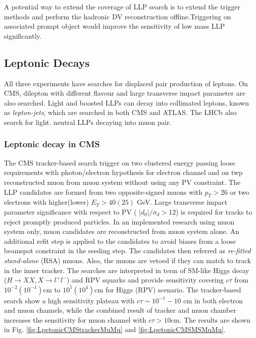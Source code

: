 A potential way to extend the coverage of LLP search is to extend the trigger methods and perform the hadronic DV reconstruction offline.Triggering on associated prompt object would improve the sensitivity of low mass LLP significantly.


\subsection{Leptonic Decays}
All three experiments have searches for displaced pair production of leptons. On CMS, dilepton with different flavour and large transverse impact parameter are also searched. Light and boosted LLPs can decay into collimated leptons, known as \textit{lepton-jets}, which are searched in both CMS and ATLAS. The LHCb also search for light. neutral LLPs decaying into muon pair.

\subsubsection{Leptonic decay in CMS}
The CMS tracker-based search trigger on two clustered energy passing loose requirements with photon/electron hypothesis for electron channel and on twp reconstructed muon from muon system without using any PV constraint. The LLP candidates are formed from two opposite-signed muons with $p_T > 26$ or two electrons with higher(lower) $E_T> 40(25)$ GeV. Large transverse impact parameter significance with respect to  PV ( $|d_0|/\sigma_d > 12$) is required for tracks to reject promptly produced particles.  In an implemented research using muon system only, muon candidates are reconstructed from muon system alone. An additional refit step is applied to  the candidates to avoid biases from  a loose beamspot constraint in the seeding step. The candidates then referred as \textit{re-fitted stand-alone} (RSA) muons. Also, the muons are vetoed if they can match to track in the inner tracker. The searches are interpreted in term of SM-like Higgs decay ($H\rightarrow XX, X\rightarrow l^+ l^-$) and RPV squarks and provide sensitivity covering $c\tau$ from $ 10^{-2} (10^{-1})$cm to $ 10^{5} (10^{4})$cm for Higgs (RPV) scenario. The tracker-based search show a high sensitivity plateau with $c\tau \sim 10^{-1}-10$ cm in both electron and muon channels, while the combined result of tracker and muon chamber increases the sensitivity for muon channel with $c\tau > 10$cm. The results are shown in Fig. \ref{fig:LpetonicCMStrackerMuMu} and \ref{fig:LpetonicCMSMSMuMu}.

